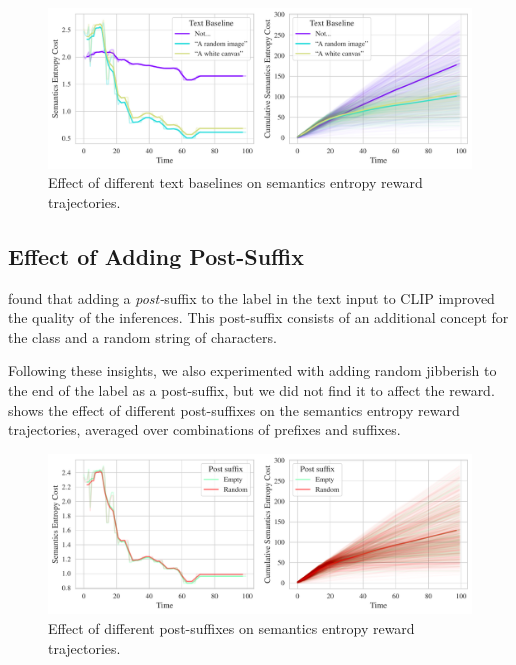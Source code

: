 \begin{figure}[h]
    \centering
    \includegraphics[width=\textwidth]{images/baseline_comparison.pdf}
    \caption{Effect of different text baselines on semantics entropy reward trajectories.}
    \label{fig:baseline}
\end{figure}

\subsection{Effect of Adding Post-Suffix}
\label{sec:post-suffix}
\cite{waffleclip} found that adding a \emph{post-}suffix to the label in the text input to CLIP improved the quality of the inferences.
This post-suffix consists of an additional concept for the class and a random string of characters.

Following these insights, we also experimented with adding random jibberish to the end of the label as a post-suffix, but we did not find it to affect the reward.
 shows the effect of different post-suffixes on the semantics entropy reward trajectories, averaged over combinations of prefixes and suffixes.

\begin{figure}[H]
    \centering
    \includegraphics[width=\textwidth]{images/post_suffix_comparison.pdf}
    \caption{Effect of different post-suffixes on semantics entropy reward trajectories.}
    \label{fig:post-suffix}
\end{figure}

